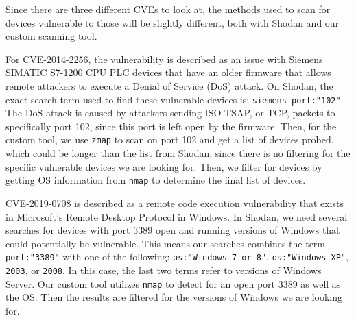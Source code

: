Since there are three different CVEs to look at, the methods used to scan
for devices vulnerable to those will be slightly different, both with
Shodan and our custom scanning tool.

For CVE-2014-2256, the vulnerability is described as an issue with Siemens
SIMATIC S7-1200 CPU PLC devices that have an older firmware that allows remote
attackers to execute a Denial of Service (DoS) attack\cite{CVE-2014-2256}. On Shodan, the exact
search term used to find these vulnerable devices is: \verb|siemens port:"102"|.
The DoS attack is caused by attackers sending ISO-TSAP, or TCP, packets to
specifically port 102, since this port is left open by the firmware. Then, for
the custom tool, we use \verb|zmap| to scan on port 102 and get a list of devices
probed, which could be longer than the list from Shodan, since there is no
filtering for the specific vulnerable devices we are looking for. Then, we filter
for devices by getting OS information from \verb|nmap| to determine the final
list of devices.

CVE-2019-0708 is described as a remote code execution vulnerability that
exists in Microsoft's Remote Desktop Protocol in Windows\cite{CVE-2019-0708}. In Shodan, we need
several searches for devices with port 3389 open and running versions of 
Windows that could potentially be vulnerable. This means our searches combines
the term \verb|port:"3389"| with one of the following: \verb|os:"Windows 7 or 8"|,
\verb|os:"Windows XP"|, \verb|2003|, or \verb|2008|. In this case, the last two
terms refer to versions of Windows Server. Our custom tool utilizes \verb|nmap|
to detect for an open port 3389 as well as the OS. Then the results are filtered
for the versions of Windows we are looking for.

